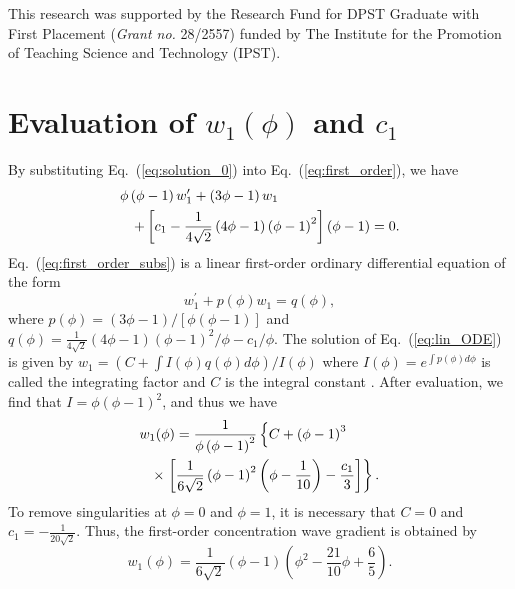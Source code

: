 \documentclass[jkps,preprint,fleqn,showpacs,showkeys]{revtex4}
\newcommand{\eq}[1]{Eq.~(\ref{#1})}
\begin{document}
\begin{acknowledgments}
This research was supported by the Research Fund for DPST Graduate with First Placement (\emph{Grant no.} 28/2557) funded by The Institute for the Promotion of Teaching Science and Technology (IPST). 
\end{acknowledgments}

\appendix
\section{Evaluation of $w_1(\phi)$ and $c_1$ \label{sec:eval}}
By substituting \eq{eq:solution_0} into \eq{eq:first_order}, we have
\begin{eqnarray}\label{eq:first_order_subs}
\lefteqn{
\phi \left(\phi-1\right) w_1^\prime + \left(3\phi-1\right) w_1 
} \nonumber\\
&& +\left[c_1 - \frac{1}{4\sqrt 2}\left(4\phi-1\right)\left(\phi-1\right)^2\right]\left(\phi-1\right) = 0.
\end{eqnarray}
\eq{eq:first_order_subs} is a linear first-order ordinary differential equation of the form
\begin{equation}\label{eq:lin_ODE}
w_1^\prime +p(\phi)w_1 = q(\phi),
\end{equation}
where $p(\phi) = (3\phi-1)/[\phi (\phi-1)]$ and $q(\phi) = \frac{1}{4\sqrt 2}(4\phi-1)(\phi-1)^2/\phi - c_1/\phi$. The solution of \eq{eq:lin_ODE} is given by $w_1 = (C + \int I(\phi)q(\phi)d\phi)/I(\phi)$ where $I(\phi) = e^{\int p(\phi)d\phi}$ is called the integrating factor and $C$ is the integral constant \cite{Arfken1985}. After evaluation, we find that $I = \phi\left(\phi-1\right)^2$, and thus we have
\begin{eqnarray}\label{eq:w1_sol}
\lefteqn{
w_1(\phi) = \frac{1}{\phi\left(\phi-1\right)^2}\left\lbrace C + \left(\phi-1\right)^3  \right. 
}\nonumber\\ 
&& \times \left. \left[\frac{1}{6\sqrt 2}\left(\phi-1\right)^2 \left(\phi-\frac{1}{10}\right) -\frac{c_1}{3}\right]\right\rbrace.
\end{eqnarray}
To remove singularities at $\phi = 0$ and $\phi = 1$, it is necessary that $C=0$ and $c_1 = -\frac{1}{20\sqrt 2}$. Thus, the first-order concentration wave gradient is obtained by 
\begin{equation}\label{eq:w1_sol_exact}
w_1(\phi) = \frac{1}{6\sqrt 2}\left(\phi-1\right) \left(\phi^2-\frac{21}{10}\phi+\frac{6}{5}\right).
\end{equation}
\end{document}

